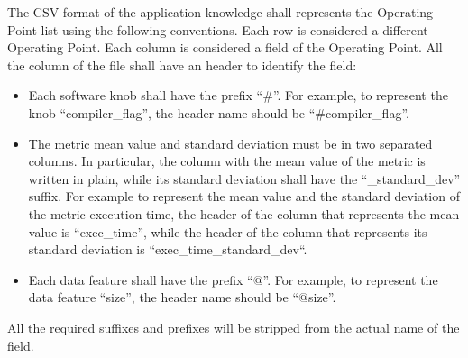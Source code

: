 The CSV format of the application knowledge shall represents the Operating Point list using the following conventions.
Each row is considered a different Operating Point.
Each column is considered a field of the Operating Point.
All the column of the file shall have an header to identify the field:
\begin{itemize}
	\item Each software knob shall have the prefix ``\#''. For example, to represent the knob ``compiler\_flag'', the header name should be ``\#compiler\_flag''.
	\item The metric mean value and standard deviation must be in two separated columns. In particular, the column with the mean value of the metric is written in plain, while its standard deviation shall have the ``\_standard\_dev'' suffix. For example to represent the mean value and the standard deviation of the metric execution time, the header of the column that represents the mean value is ``exec\_time'', while the header of the column that represents its standard deviation is ``exec\_time\_standard\_dev``.
	\item Each data feature shall have the prefix ``$@$''. For example, to represent the data feature ``size'', the header name should be ``$@$size''.
\end{itemize}

All the required suffixes and prefixes will be stripped from the actual name of the field.